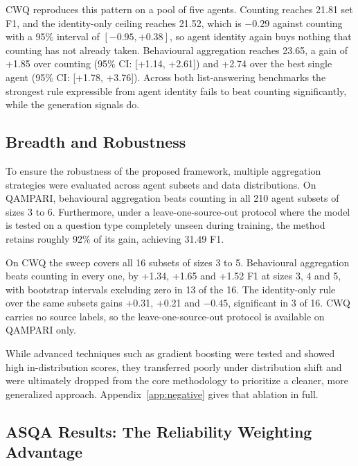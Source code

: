 \documentclass{article}
\begin{document}
CWQ reproduces this pattern on a pool of five agents. Counting reaches 21.81 set F1, and the identity-only ceiling reaches 21.52, which is $-0.29$ against counting with a 95\% interval of $[-0.95, +0.38]$, so agent identity again buys nothing that counting has not already taken. Behavioural aggregation reaches 23.65, a gain of +1.85 over counting (95\% CI: [+1.14, +2.61]) and +2.74 over the best single agent (95\% CI: [+1.78, +3.76]). Across both list-answering benchmarks the strongest rule expressible from agent identity fails to beat counting significantly, while the generation signals do.


\subsection{Breadth and Robustness}
\label{sec:breadth}
\label{sec:robust}

To ensure the robustness of the proposed framework, multiple aggregation strategies were evaluated across agent subsets and data distributions. On QAMPARI, behavioural aggregation beats counting in all 210 agent subsets of sizes 3 to 6. Furthermore, under a leave-one-source-out protocol where the model is tested on a question type completely unseen during training, the method retains roughly 92\% of its gain, achieving 31.49 F1.

On CWQ the sweep covers all 16 subsets of sizes 3 to 5. Behavioural aggregation beats counting in every one, by +1.34, +1.65 and +1.52 F1 at sizes 3, 4 and 5, with bootstrap intervals excluding zero in 13 of the 16. The identity-only rule over the same subsets gains +0.31, +0.21 and $-0.45$, significant in 3 of 16. CWQ carries no source labels, so the leave-one-source-out protocol is available on QAMPARI only.

While advanced techniques such as gradient boosting were tested and showed high in-distribution scores, they transferred poorly under distribution shift and were ultimately dropped from the core methodology to prioritize a cleaner, more generalized approach. Appendix~\ref{app:negative} gives that ablation in full.
\subsection{ASQA Results: The Reliability Weighting Advantage}
\label{sec:rq3}

\end{document}
